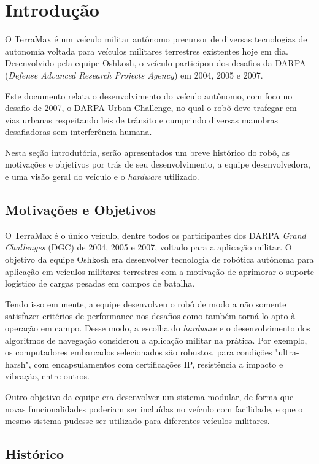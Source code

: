 \section{Introdução}

O TerraMax é um veículo militar autônomo precursor de diversas tecnologias de autonomia voltada para veículos militares terrestres existentes hoje em dia. Desenvolvido pela equipe Oshkosh, o veículo participou dos desafios da DARPA (\emph{Defense Advanced Research Projects Agency}) em 2004, 2005 e 2007.

Este documento relata o desenvolvimento do veículo autônomo, com foco no desafio de 2007, o DARPA Urban Challenge, no qual o robô deve trafegar em vias urbanas respeitando leis de trânsito e cumprindo diversas manobras desafiadoras sem interferência humana.

Nesta seção introdutória, serão apresentados um breve histórico do robô, as motivações e objetivos por trás de seu desenvolvimento, a equipe desenvolvedora, e uma visão geral do veículo e o \emph{hardware} utilizado.

\subsection{Motivações e Objetivos}

O TerraMax é o único veículo, dentre todos os participantes dos DARPA \emph{Grand Challenges} (DGC) de 2004, 2005 e 2007, voltado para a aplicação militar. O objetivo da equipe Oshkosh era desenvolver tecnologia de robótica autônoma para aplicação em veículos militares terrestres com a motivação de aprimorar o suporte logístico de cargas pesadas em campos de batalha.

Tendo isso em mente, a equipe desenvolveu o robô de modo a não somente satisfazer critérios de performance nos desafios como também torná-lo apto à operação em campo. Desse modo, a escolha do \emph{hardware} e o desenvolvimento dos algoritmos de navegação considerou a aplicação militar na prática. Por exemplo, os computadores embarcados selecionados são robustos, para condições "ultra-harsh", com encapsulamentos com certificações IP, resistência a impacto e vibração, entre outros.

Outro objetivo da equipe era desenvolver um sistema modular, de forma que novas funcionalidades poderiam ser incluídas no veículo com facilidade, e que o mesmo sistema pudesse ser utilizado para diferentes veículos militares.

\subsection{Histórico}

